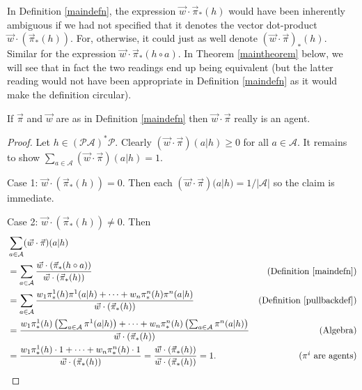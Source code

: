 \documentclass[runningheads]{llncs}
\begin{document}
\begin{remark}
\label{ambiguityremark}
    In Definition \ref{maindefn},
    the expression $\vec w\cdot \vec\pi_*(h)$ would have been inherently
    ambiguous if we had not specified that it denotes
    the vector dot-product $\vec w\cdot (\vec\pi_*(h))$.
    For, otherwise, it could just as well denote
    $(\vec w\cdot \vec\pi)_*(h)$. Similar for the expression
    $\vec w\cdot \vec\pi_*(h\circ a)$.
    In Theorem \ref{maintheorem} below, we will see that in fact
    the two readings end up being equivalent
    (but the latter reading would not have been appropriate
    in Definition \ref{maindefn} as it would make the definition circular).
\end{remark}

\begin{lemma}
    If $\vec\pi$ and $\vec w$ are as in Definition \ref{maindefn}
    then $\vec w\cdot\vec\pi$ really is an agent.
\end{lemma}

\begin{proof}
    Let $h\in(\mathcal P\mathcal A)^*\mathcal P$.
    Clearly $(\vec w\cdot\vec\pi)(a|h)\geq 0$ for all $a\in\mathcal A$.
    It remains to show
    $\sum_{a\in\mathcal A}(\vec w\cdot\vec\pi)(a|h)=1$.

    Case 1: $\vec w\cdot (\vec\pi_*(h))=0$. Then
    each $(\vec w\cdot\vec\pi)(a|h)=1/|\mathcal A|$ so the
    claim is immediate.

    Case 2: $\vec w\cdot (\vec\pi_*(h))\not=0$. Then
    \begin{align*}
        &{} \sum_{a\in\mathcal A}(\vec w\cdot\vec\pi)(a|h)\\
            &= \sum_{a\in\mathcal A}
                \frac{\vec w\cdot (\vec\pi_*(h\circ a))}{\vec w\cdot (\vec\pi_*(h))}
                &\mbox{(Definition \ref{maindefn})}\\
            &= \sum_{a\in\mathcal A}
                \frac
                {w_1\pi^1_*(h)\pi^1(a|h)+\cdots+w_n\pi^n_*(h)\pi^n(a|h)}
                {\vec w\cdot(\vec\pi_*(h))}
                &\mbox{(Definition \ref{pullbackdef})}\\
            &= \frac{
                w_1\pi^1_*(h)\left(\mbox{$\sum_{a\in\mathcal A}\pi^1(a|h)$}\right)
                +\cdots+
                w_n\pi^n_*(h)\left(\mbox{$\sum_{a\in\mathcal A}\pi^n(a|h)$}\right)
                }
                {\vec w\cdot (\vec\pi_*(h))}
                &\mbox{(Algebra)}\\
            &= \frac
                {w_1\pi^1_*(h)\cdot 1 + \cdots + w_n\pi^n_*(h)\cdot1}
                {\vec w\cdot (\vec\pi_*(h))}
                =\frac{\vec w\cdot (\vec\pi_*(h))}{\vec w\cdot (\vec\pi_*(h))}=1.
                &\mbox{($\pi^i$ are agents)}
    \end{align*}
\end{proof}
\end{document}

